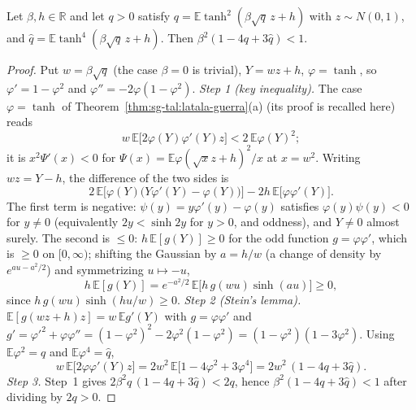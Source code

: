 \begin{theorem}
\label{thm:sg-tal:lemma-193}
  \leanok
{}
Let $\beta,h\in\mathbb R$ and let $q>0$ satisfy $q=\mathbb E\tanh^2(\beta\sqrt q\,z+h)$ with $z\sim N(0,1)$,
and $\hat q=\mathbb E\tanh^4(\beta\sqrt q\,z+h)$.  Then $\beta^2(1-4q+3\hat q)<1$.
\end{theorem}
\begin{proof}
  \leanok
Put $w=\beta\sqrt q$ (the case $\beta=0$ is trivial), $Y=wz+h$, $\varphi=\tanh$, so $\varphi'=1-\varphi^2$ and $\varphi''=-2\varphi(1-\varphi^2)$.
\emph{Step 1 (key inequality).} The case $\varphi=\tanh$ of Theorem~\ref{thm:sg-tal:latala-guerra}(a) (its proof is recalled here) reads
\[
w\,\mathbb E\big[2\varphi(Y)\varphi'(Y)z\big]<2\,\mathbb E\varphi(Y)^2 ;
\]
it is $x^2\Psi'(x)<0$ for $\Psi(x)=\mathbb E\varphi(\sqrt xz+h)^2/x$ at $x=w^2$. Writing $wz=Y-h$, the difference of the two sides is
\[
2\,\mathbb E\big[\varphi(Y)\big(Y\varphi'(Y)-\varphi(Y)\big)\big]-2h\,\mathbb E\big[\varphi\varphi'(Y)\big].
\]
The first term is negative: $\psi(y)=y\varphi'(y)-\varphi(y)$ satisfies $\varphi(y)\psi(y)<0$ for $y\ne0$ (equivalently $2y<\sinh2y$ for $y>0$, and oddness), and $Y\ne0$ almost surely. The second is $\le0$: $h\,\mathbb E[g(Y)]\ge0$ for the odd function $g=\varphi\varphi'$, which is $\ge0$ on $[0,\infty)$; shifting the Gaussian by $a=h/w$ (a change of density by $e^{au-a^2/2}$) and symmetrizing $u\mapsto-u$,
\[
h\,\mathbb E[g(Y)]=e^{-a^2/2}\,\mathbb E\big[h\,g(wu)\sinh(au)\big]\ge0,
\]
since $h\,g(wu)\sinh(hu/w)\ge0$.
\emph{Step 2 (Stein's lemma).} $\mathbb E[g(wz+h)z]=w\,\mathbb Eg'(Y)$ with $g=\varphi\varphi'$ and $g'=\varphi'^2+\varphi\varphi''=(1-\varphi^2)^2-2\varphi^2(1-\varphi^2)=(1-\varphi^2)(1-3\varphi^2)$. Using $\mathbb E\varphi^2=q$ and $\mathbb E\varphi^4=\hat q$,
\[
w\,\mathbb E\big[2\varphi\varphi'(Y)z\big]=2w^2\,\mathbb E\big[1-4\varphi^2+3\varphi^4\big]=2w^2\,(1-4q+3\hat q).
\]
\emph{Step 3.} Step~1 gives $2\beta^2q\,(1-4q+3\hat q)<2q$, hence $\beta^2(1-4q+3\hat q)<1$ after dividing by $2q>0$.
\end{proof}

